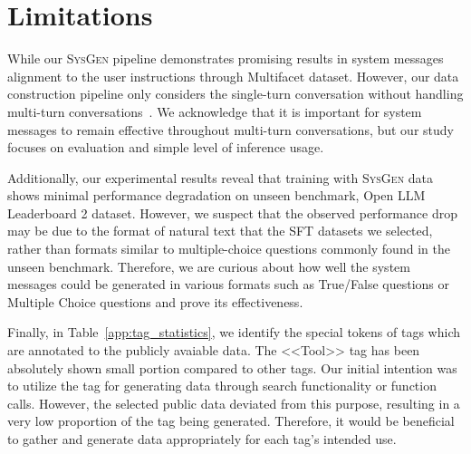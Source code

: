 \section*{Limitations}
While our \textsc{SysGen} pipeline demonstrates promising results in system messages alignment to the user instructions through Multifacet dataset.
However, our data construction pipeline only considers the single-turn conversation without handling multi-turn conversations~\citep{qin2024sysbench}.
We acknowledge that it is important for system messages to remain effective throughout multi-turn conversations, but our study focuses on evaluation and simple level of inference usage.

Additionally, our experimental results reveal that training with \textsc{SysGen} data shows minimal performance degradation on unseen benchmark, Open LLM Leaderboard 2 dataset.
However, we suspect that the observed performance drop may be due to the format of natural text that the SFT datasets we selected, rather than formats similar to multiple-choice questions commonly found in the unseen benchmark. 
Therefore, we are curious about how well the system messages could be generated in various formats such as True/False questions or Multiple Choice questions and prove its effectiveness.

Finally, in Table~\ref{app:tag_statistics}, we identify the special tokens of tags which are annotated to the publicly avaiable data.
The <<Tool>> tag has been absolutely shown small portion compared to other tags.
Our initial intention was to utilize the tag for generating data through search functionality or function calls. 
However, the selected public data deviated from this purpose, resulting in a very low proportion of the tag being generated.
Therefore, it would be beneficial to gather and generate data appropriately for each tag's intended use.